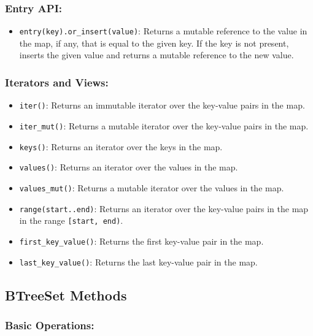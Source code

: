 \documentclass[
  11pt,
]{article}
\providecommand{\tightlist}{%
  \setlength{\itemsep}{0pt}\setlength{\parskip}{0pt}}
\begin{document}
\subsubsection{Entry API:}\label{entry-api-2}

\begin{itemize}
\tightlist
\item
  \texttt{entry(key).or\_insert(value)}: Returns a mutable reference to
  the value in the map, if any, that is equal to the given key. If the
  key is not present, inserts the given value and returns a mutable
  reference to the new value.
\end{itemize}

\subsubsection{Iterators and Views:}\label{iterators-and-views-2}

\begin{itemize}
\tightlist
\item
  \texttt{iter()}: Returns an immutable iterator over the key-value
  pairs in the map.
\item
  \texttt{iter\_mut()}: Returns a mutable iterator over the key-value
  pairs in the map.
\item
  \texttt{keys()}: Returns an iterator over the keys in the map.
\item
  \texttt{values()}: Returns an iterator over the values in the map.
\item
  \texttt{values\_mut()}: Returns a mutable iterator over the values in
  the map.
\item
  \texttt{range(start..end)}: Returns an iterator over the key-value
  pairs in the map in the range \texttt{{[}start,\ end)}.
\item
  \texttt{first\_key\_value()}: Returns the first key-value pair in the
  map.
\item
  \texttt{last\_key\_value()}: Returns the last key-value pair in the
  map.
\end{itemize}

\subsection{BTreeSet Methods}\label{btreeset-methods}

\subsubsection{Basic Operations:}\label{basic-operations-3}
\end{document}
